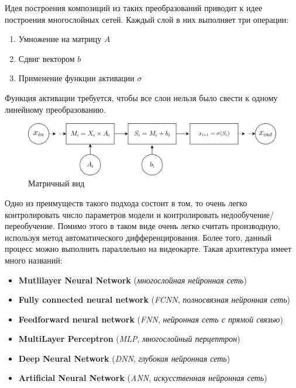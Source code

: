 Идея построения композиций из таких преобразований приводит к идее построения многослойных сетей. Каждый слой в них выполняет три операции:
\begin{enumerate}
    \item Умножение на матрицу $A$
    \item Сдвиг вектором $b$
    \item Применение функции активации $\sigma$
\end{enumerate}

\begin{remark}
    Функция активации требуется, чтобы все слои нельзя было свести к одному линейному преобразованию.
\end{remark}

\begin{figure}[htb]
    \centering
    \includegraphics[scale=0.27]{images/matrix-net.png}
    \caption{Матричный вид}
\end{figure}

Одно из преимуществ такого подхода состоит в том, то очень легко контролировать число параметров модели и контролировать недообучение/переобучение. Помимо этого в таком виде очень легко считать производную, используя метод автоматического дифференцирования. Более того, данный процесс можно выполнить параллельно на видеокарте.\newline
Такая архитектура имеет много названий:
\begin{itemize}
    \item \textbf{Mutlilayer Neural Network} (\textit{многослойная нейронная сеть})
    \item \textbf{Fully connected neural network} (\textit{FCNN}, \textit{полносвязная нейронная сеть})
    \item \textbf{Feedforward neural network} (\textit{FNN}, \textit{нейронная сеть с прямой связью})
    \item \textbf{MultiLayer Perceptron} (\textit{MLP}, \textit{многослойный перцептрон})
    \item \textbf{Deep Neural Network} (\textit{DNN}, \textit{глубокая нейронная сеть})
    \item \textbf{Artificial Neural Network} (\textit{ANN}, \textit{искусственная нейронная сеть})
\end{itemize}

